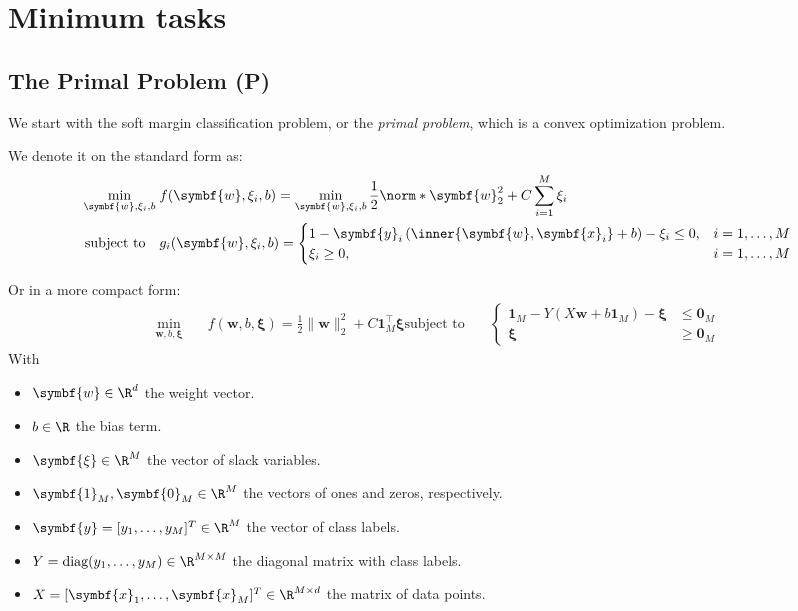 \chapter{Minimum tasks}
\section{The Primal Problem (P)}

We start with the soft margin classification problem, or the \emph{primal problem}, which is a convex optimization problem.

We denote it on the standard form as:
\begin{align*}
  \min_{\symbf{w}, \xi_i, b} \; & f(\symbf{w}, \xi_i, b) =  \min_{\symbf{w}, \xi_i, b} \frac{1}{2} \norm*{\symbf{w}}_2^2 + C \sum_{i=1}^M \xi_i \\
  \text{subject to} \quad       & g_i(\symbf{w},\xi_i, b) =
  \begin{cases}
    1 - \symbf{y}_i\left(\inner{\symbf{w}, \symbf{x}_i} + b\right) - \xi_i \leq 0, & i = 1, \ldots, M \\
    \xi_i \geq 0,                                                                  & i = 1, \ldots, M
  \end{cases}
\end{align*}

Or in a more compact form:
\begin{align*}
  \min_{\symbf{w}, b, \symbf{\xi}} \quad & f(\symbf{w}, b, \symbf{\xi}) = \frac{1}{2}\|\symbf{w}\|_2^2 + C\symbf{1}_M^\top \symbf{\xi} \text{subject to} \quad &
  \begin{cases}
    \symbf{1}_M - Y(X\symbf{w} + b\symbf{1}_M) - \symbf{\xi} & \leq \symbf{0}_M \\
    \symbf{\xi}                                              & \geq \symbf{0}_M
  \end{cases}\tag{P}
\end{align*}
With
\begin{itemize}
  \item $\symbf{w} \in \R^d$ the weight vector.
  \item $b \in \R$ the bias term.
  \item $\symbf{\xi} \in \R^M$ the vector of slack variables.
  \item $\symbf{1}_M, \symbf{0}_M \in \R^M$ the vectors of ones and zeros, respectively.
  \item $\symbf{y} = [y_1, \ldots, y_M]^T \in \R^M$ the vector of class labels.
  \item $Y = \text{diag}(y_1, \ldots, y_M) \in \R^{M \times M}$ the diagonal matrix with class labels.
  \item $X = [\symbf{x}_1, \ldots, \symbf{x}_M]^T \in \R^{M \times d}$ the matrix of data points.
\end{itemize}

